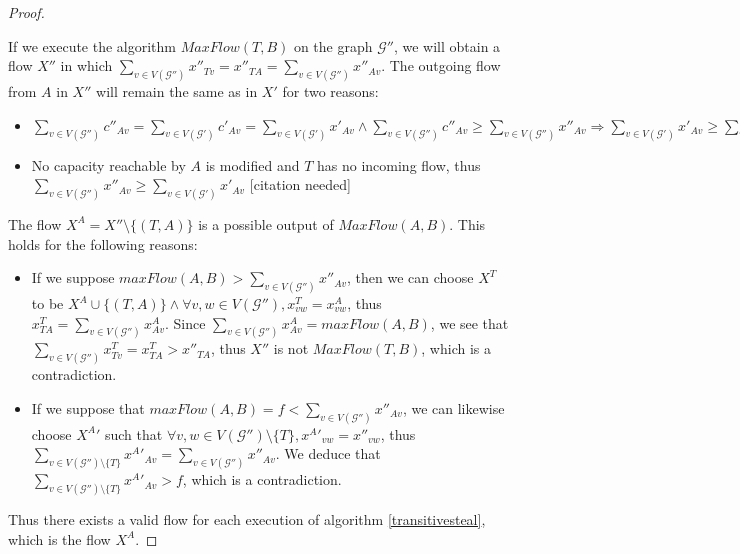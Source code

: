 \documentclass[11pt]{article}
\theoremstyle{definition}
\theoremstyle{corollary}
\theoremstyle{lemma}
\begin{document}
\begin{proof}
\begin{itemize}
       \end{itemize}
       If we execute the algorithm $MaxFlow(T, B)$ on the graph $\mathcal{G}''$, we will obtain a flow $X''$ in which
       $\sum\limits_{v \in V(\mathcal{G}'')}x''_{Tv} = x''_{TA} = \sum\limits_{v \in V(\mathcal{G}'')}x''_{Av}$. The outgoing
       flow from $A$ in $X''$ will remain the same as in $X'$ for two reasons:
       \begin{itemize}
          \item $\sum\limits_{v \in V(\mathcal{G}'')}c''_{Av} = \sum\limits_{v \in V(\mathcal{G}')}c'_{Av} = \sum\limits_{v
          \in V(\mathcal{G}')}x'_{Av} \wedge \sum\limits_{v \in V(\mathcal{G}'')}c''_{Av} \geq \sum\limits_{v \in
          V(\mathcal{G}'')}x''_{Av} \Rightarrow \sum\limits_{v \in V(\mathcal{G}')}x'_{Av} \geq \sum\limits_{v \in
          V(\mathcal{G}'')}x''_{Av}$
          \item No capacity reachable by $A$ is modified and $T$ has no incoming flow, thus $\sum\limits_{v \in
          V(\mathcal{G}'')}x''_{Av} \geq \sum\limits_{v \in V(\mathcal{G}')}x'_{Av}$ [citation needed]
       \end{itemize}
       The flow $X^A = X'' \setminus \{(T, A)\}$ is a possible output of $MaxFlow(A, B)$. This holds for the following
       reasons:
       \begin{itemize}
          \item If we suppose $maxFlow(A, B) > \sum\limits_{v \in V(\mathcal{G}'')}x''_{Av}$, then we can choose $X^T$ to be
          $X^A \cup \{(T, A)\} \wedge \forall v, w \in V(\mathcal{G}''), x^T_{vw} = x^A_{vw}$, thus $x^T_{TA} =
          \sum\limits_{v \in V(\mathcal{G}'')}x^A_{Av}$. Since $\sum\limits_{v \in V(\mathcal{G}'')}x^A_{Av} =
          maxFlow(A, B)$, we see that $\sum\limits_{v \in V(\mathcal{G}'')}x^T_{Tv} = x^T_{TA} > x''_{TA}$, thus $X''$ is not
          $MaxFlow(T, B)$, which is a contradiction.
          \item If we suppose that $maxFlow(A, B) = f < \sum\limits_{v \in V(\mathcal{G}'')}x''_{Av}$, we can likewise choose
          ${X^A}'$ such that $\forall v, w \in V(\mathcal{G}'') \setminus \{T\}, {x^A}'_{vw} = x''_{vw}$, thus
          $\sum\limits_{v \in V(\mathcal{G}'') \setminus \{T\}}{x^A}'_{Av} = \sum\limits_{v \in V(\mathcal{G}'')}x''_{Av}$.
          We deduce that $\sum\limits_{v \in V(\mathcal{G}'') \setminus \{T\}}{x^A}'_{Av} > f$, which is a contradiction.
       \end{itemize}
       Thus there exists a valid flow for each execution of algorithm \ref{transitivesteal}, which is the flow $X^A$.
    \end{proof}
\end{document}
